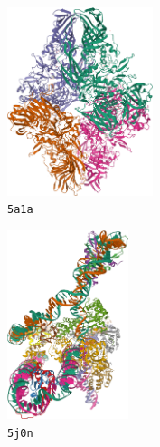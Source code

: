 \begin{figure}[ht!]
    \centering
    \begin{minipage}[b]{0.6\linewidth}
        \centering
        \begin{subfigure}[b]{0.49\linewidth}
            \centering
            \includegraphics[height=5.5cm]{figures/5a1a_pdb.png}
            \caption{\texttt{5a1a}}
        \end{subfigure}
        \hfill
        \begin{subfigure}[b]{0.42\linewidth}
            \centering
            \includegraphics[height=5.5cm]{figures/5j0n_pdb.png}
            \caption{\texttt{5j0n}}
        \end{subfigure}
        \caption{%
            The ground-truth proteins: $\beta$-galactosidase (\texttt{5a1a})~\cite{5a1a_pdb}, and lambda excision HJ intermediate (HJI) (\texttt{5j0n})~\cite{5j0n_pdb}.
        }\label{fig:pdb-proteins}
    \end{minipage}
    \hfill
    \begin{minipage}[b]{0.35\linewidth}
        \centering
        \begin{subfigure}[b]{0.49\textwidth}
            \centering

\end{subfigure}
\end{minipage}
\end{figure}
